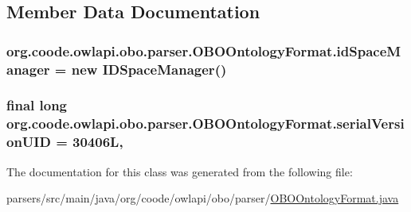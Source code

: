 \subsection{Member Data Documentation}
\hypertarget{classorg_1_1coode_1_1owlapi_1_1obo_1_1parser_1_1_o_b_o_ontology_format_ab940db5ccb7b16c1c677d6b8130d59ab}{
\subsubsection[{id\-Space\-Manager}]{ org.\-coode.\-owlapi.\-obo.\-parser.\-O\-B\-O\-Ontology\-Format.\-id\-Space\-Manager = new {\bf I\-D\-Space\-Manager}()\hspace{0.3cm}{\ttfamily [private]}}}\label{classorg_1_1coode_1_1owlapi_1_1obo_1_1parser_1_1_o_b_o_ontology_format_ab940db5ccb7b16c1c677d6b8130d59ab}
\hypertarget{classorg_1_1coode_1_1owlapi_1_1obo_1_1parser_1_1_o_b_o_ontology_format_ae7de80098edfd84ad4dcc359fc30938f}{
\subsubsection[{serial\-Version\-U\-I\-D}]{\setlength{\rightskip}{0pt plus 5cm}final long org.\-coode.\-owlapi.\-obo.\-parser.\-O\-B\-O\-Ontology\-Format.\-serial\-Version\-U\-I\-D = 30406\-L\hspace{0.3cm}{\ttfamily [static]}, {\ttfamily [private]}}}\label{classorg_1_1coode_1_1owlapi_1_1obo_1_1parser_1_1_o_b_o_ontology_format_ae7de80098edfd84ad4dcc359fc30938f}


The documentation for this class was generated from the following file\-:\begin{DoxyCompactItemize}
\item 
parsers/src/main/java/org/coode/owlapi/obo/parser/\hyperlink{_o_b_o_ontology_format_8java}{O\-B\-O\-Ontology\-Format.\-java}\end{DoxyCompactItemize}
